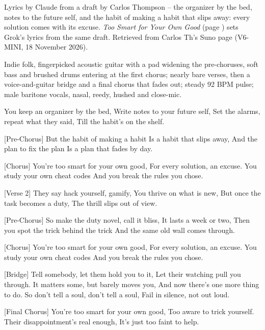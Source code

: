%


\label{sec:too-smart-for-your-own-good}
\begin{notes}
Lyrics by Claude from a draft by Carlos Thompson -- the organizer by the bed, notes to the future self, and the habit of making a habit that slips away: every solution comes with its excuse. \emph{Too Smart for Your Own Good} (page \pageref{sec:too-smart-for-your-own-good-dubstep}) sets Grok's lyrics from the same draft. Retrieved from Carlos Th's Suno page (V6-MINI, 18 November 2026).
\end{notes}
\begin{style}
Indie folk, fingerpicked acoustic guitar with a pad widening the pre-choruses, soft bass and brushed drums entering at the first chorus; nearly bare verses, then a voice-and-guitar bridge and a final chorus that fades out; steady 92 BPM pulse; male baritone vocals, nasal, reedy, hushed and close-mic.
\end{style}
\begin{lyrics}
[Verse 1]
You keep an organizer by the bed,
Write notes to your future self,
Set the alarms, repeat what they said,
Till the habit's on the shelf.

[Pre-Chorus]
But the habit of making a habit
Is a habit that slips away,
And the plan to fix the plan
Is a plan that fades by day.

[Chorus]
You're too smart for your own good,
For every solution, an excuse.
You study your own cheat codes
And you break the rules you chose.

[Verse 2]
They say hack yourself, gamify,
You thrive on what is new,
But once the task becomes a duty,
The thrill slips out of view.

[Pre-Chorus]
So make the duty novel, call it bliss,
It lasts a week or two,
Then you spot the trick behind the trick
And the same old wall comes through.

[Chorus]
You're too smart for your own good,
For every solution, an excuse.
You study your own cheat codes
And you break the rules you chose.

[Bridge]
Tell somebody, let them hold you to it,
Let their watching pull you through.
It matters some, but barely moves you,
And now there’s one more thing to do.
So don’t tell a soul, don’t tell a soul,
Fail in silence, not out loud.

[Final Chorus]
You’re too smart for your own good,
Too aware to trick yourself.
Their disappointment’s real enough,
It’s just too faint to help.
\end{lyrics}


